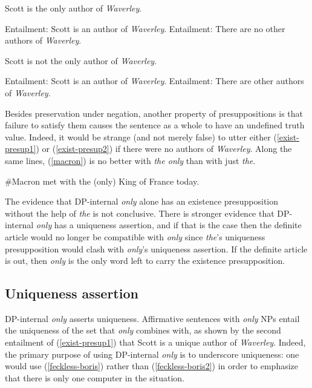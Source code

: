 \begin{exe}
	\ex \label{exist-presup1} Scott is the only author of \textit{Waverley}.
		\begin{xlist}
			\ex Entailment: Scott is an author of \textit{Waverley}.
			\ex Entailment: There are no other authors of \textit{Waverley}.
		\end{xlist}
	\ex \label{exist-presup2} Scott is not the only author of \textit{Waverley}.
		\begin{xlist}
			\ex Entailment: Scott is an author of \textit{Waverley}.
			\ex Entailment: There are other authors of \textit{Waverley}.
		\end{xlist}
\end{exe}

Besides preservation under negation, another property of presuppositions is that failure to satisfy them causes the sentence as a whole to have an undefined truth value. Indeed, it would be strange (and not merely false) to utter either (\ref{exist-presup1}) or (\ref{exist-presup2}) if there were no authors of \textit{Waverley}. Along the same lines, (\ref{macron}) is no better with \textit{the only} than with just \textit{the}.

\begin{exe}
	\ex \label{macron} \#Macron met with the (only) King of France today.
\end{exe}

The evidence that DP-internal \textit{only} alone has an existence presupposition without the help of \textit{the} is not conclusive. There is stronger evidence that DP-internal \textit{only} has a uniqueness assertion, and if that is the case then the definite article would no longer be compatible with \textit{only} since \textit{the}'s uniqueness presupposition would clash with \textit{only}'s uniqueness assertion. If the definite article is out, then \textit{only} is the only word left to carry the existence presupposition.

\subsection{Uniqueness assertion}
DP-internal \textit{only} asserts uniqueness. Affirmative sentences with \textit{only} NPs entail the uniqueness of the set that \textit{only} combines with, as shown by the second entailment of (\ref{exist-presup1}) that Scott is a unique author of \textit{Waverley}. Indeed, the primary purpose of using DP-internal \textit{only} is to underscore uniqueness: one would use (\ref{feckless-boris}) rather than (\ref{feckless-boris2}) in order to emphasize that there is only one computer in the situation.

